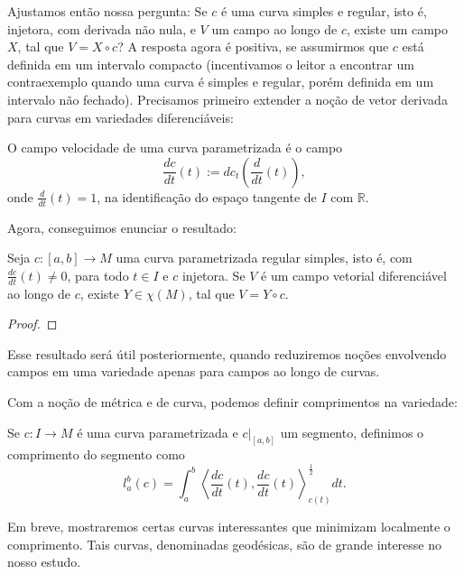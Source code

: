 Ajustamos então nossa pergunta: Se $c$ é uma curva simples e regular, isto é, injetora, com derivada não nula, e $V$ um campo ao longo de $c$, existe um campo $X$, tal que $V=X \circ c$? A resposta agora é positiva, se assumirmos que $c$ está definida em um intervalo compacto (incentivamos o leitor a encontrar um contraexemplo quando uma curva é simples e regular, porém definida em um intervalo não fechado). Precisamos primeiro extender a noção de vetor derivada para curvas em variedades diferenciáveis:
\begin{definition}
    \label{loc:2.9_:_def_5_:_campo_velocidade_da_curva}
    O campo velocidade de uma curva parametrizada é o campo
    \begin{equation*}
        \frac{dc}{dt}(t) :=dc_{t}\left( \frac{d}{dt}(t) \right),
    \end{equation*}
    onde $\frac{d}{dt}(t)=1$, na identificação do espaço tangente de $I$ com $\mathbb{R}$.
\end{definition}
Agora, conseguimos enunciar o resultado:
\begin{theorem}
    \label{loc:teorema_:_extensão_de_um_campo_ao_longo_de_curva_regular_simples_para_um_campo_na_variedade}
    Seja $c:[a,b]\to M$ uma curva parametrizada regular simples, isto é, com $\frac{dc}{dt}(t)\neq0$, para todo $t \in I$ e $c$  injetora. Se $V$ é um campo vetorial diferenciável ao longo de $c$, existe $Y \in \chi(M)$, tal que $V=Y \circ c$.
    \begin{proof}

    \end{proof}
\end{theorem}
Esse resultado será útil posteriormente, quando reduziremos noções envolvendo campos em uma variedade apenas para campos ao longo de curvas.

Com a noção de métrica e de curva, podemos definir comprimentos na variedade:
\begin{definition}
    \label{loc:2.9_:_def_6_:_comprimento_da_curva}
    Se $c:I\to M$ é uma curva parametrizada e $c|_{[a,b]}$ um segmento, definimos o comprimento do segmento como
    \begin{equation*}
        l_{a}^{b}(c)=\int_{a}^{b}\left<\frac{dc}{dt}(t),\frac{dc}{dt}(t)\right>_{c(t)}^{\frac{1}{2}}dt.
    \end{equation*}
\end{definition}
Em breve, mostraremos certas curvas interessantes que minimizam localmente o comprimento. Tais curvas, denominadas geodésicas, são de grande interesse no nosso estudo.

